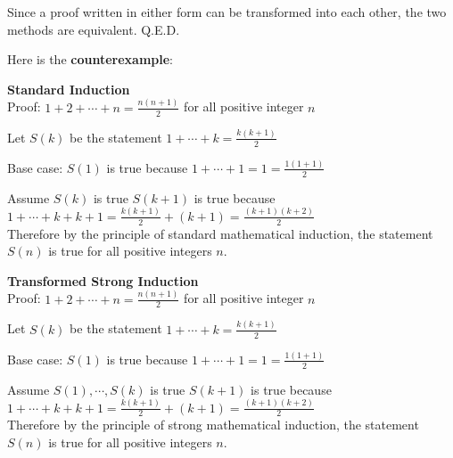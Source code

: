 \begin{flushleft}
Since a proof written in either form can be transformed into each other, 
the two methods are equivalent. Q.E.D.
\vspace{10px}

Here is the \textbf{counterexample}:
\vspace{10px}

\textbf{Standard Induction} \\
Proof: $1 + 2 + \cdots + n = \frac{n(n + 1)}{2}$ for all positive integer $n$
\vspace{10px}

Let $S(k)$ be the statement $1 + \cdots + k = \frac{k(k + 1)}{2}$
\vspace{10px}

Base case: 
$S(1)$ is true because $1 + \cdots + 1 = 1 = \frac{1(1 + 1)}{2}$
\vspace{10px}

Assume $S(k)$ is true
$S(k + 1)$ is true because $1 + \cdots + k + k + 1 
                         = \frac{k(k + 1)}{2} + (k + 1) 
                         = \frac{(k+1)(k + 2)}{2}$ \\
Therefore by the principle of standard mathematical induction, 
the statement $S(n)$ is true for all positive integers $n$.
\vspace{10px}

\textbf{Transformed Strong Induction} \\
Proof: $1 + 2 + \cdots + n = \frac{n(n + 1)}{2}$ for all positive integer $n$
\vspace{10px}

Let $S(k)$ be the statement $1 + \cdots + k = \frac{k(k + 1)}{2}$
\vspace{10px}

Base case: 
$S(1)$ is true because $1 + \cdots + 1 = 1 = \frac{1(1 + 1)}{2}$
\vspace{10px}

Assume $S(1), \cdots, S(k)$ is true
$S(k + 1)$ is true because $1 + \cdots + k + k + 1 
                         = \frac{k(k + 1)}{2} + (k + 1) 
                         = \frac{(k + 1)(k + 2)}{2}$ \\
Therefore by the principle of strong mathematical induction, 
the statement $S(n)$ is true for all positive integers $n$.
\end{flushleft}